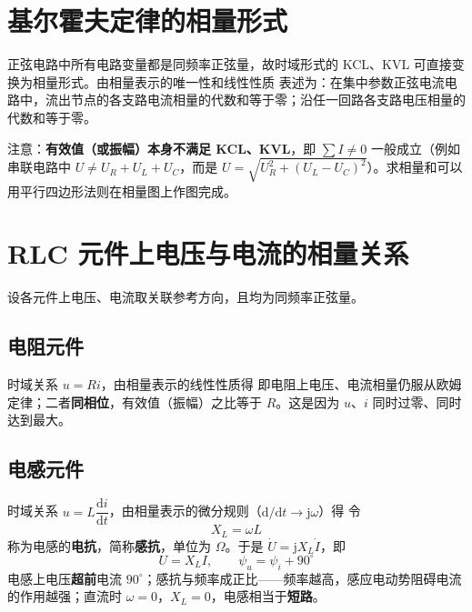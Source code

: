 
\section{基尔霍夫定律的相量形式}
正弦电路中所有电路变量都是同频率正弦量，故时域形式的 KCL、KVL 可直接变换为相量形式。由相量表示的唯一性和线性性质
表述为：在集中参数正弦电流电路中，流出节点的各支路电流相量的代数和等于零；沿任一回路各支路电压相量的代数和等于零。

注意：\textbf{有效值（或振幅）本身不满足 KCL、KVL}，即 $\sum I\neq0$ 一般成立（例如串联电路中 $U\neq U_R+U_L+U_C$，而是 $U=\sqrt{U_R^2+(U_L-U_C)^2}$）。求相量和可以用平行四边形法则在相量图上作图完成。


\section{RLC 元件上电压与电流的相量关系}
设各元件上电压、电流取关联参考方向，且均为同频率正弦量。

\subsection{电阻元件}
时域关系 $u=Ri$，由相量表示的线性性质得
即电阻上电压、电流相量仍服从欧姆定律；二者\textbf{同相位}，有效值（振幅）之比等于 $R$。这是因为 $u$、$i$ 同时过零、同时达到最大。

\subsection{电感元件}
时域关系 $u=L\dfrac{\mathrm{d}i}{\mathrm{d}t}$，由相量表示的微分规则（$\mathrm{d}/\mathrm{d}t\to\mathrm{j}\omega$）得
令
\begin{equation}
X_L=\omega L
\end{equation}
称为电感的\textbf{电抗}，简称\textbf{感抗}，单位为 $\Omega$。于是 $\dot{U}=\mathrm{j}X_L\dot{I}$，即
\begin{equation}
U=X_LI,\qquad \psi_u=\psi_i+90^\circ
\end{equation}
电感上电压\textbf{超前}电流 $90^\circ$；感抗与频率成正比——频率越高，感应电动势阻碍电流的作用越强；直流时 $\omega=0$，$X_L=0$，电感相当于\textbf{短路}。

